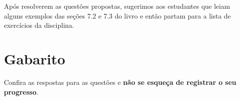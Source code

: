 \documentclass[main_estudante.tex]{subfiles}
\begin{document}
Após resolverem as questões propostas, sugerimos aos estudantes que leiam alguns exemplos das seções 7.2 e 7.3 do livro  e então partam para a lista de exercícios da disciplina.

\newpage

\paraAmbos

\section{Gabarito}

Confira as respostas para as questões e \textbf{não se esqueça de registrar o seu progresso}.

\imprimeGabarito

\paraAmbos
\end{document}
